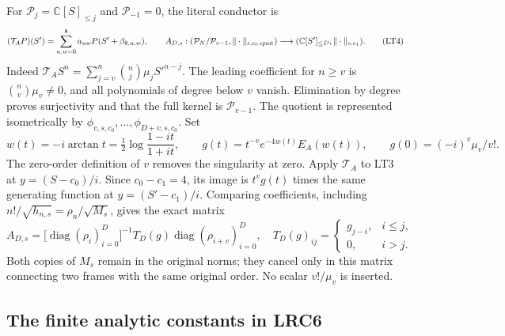 \documentclass[11pt,a4paper]{article}
\begin{document}
For $\mathcal P_j=\mathbb C[S]_{\le j}$ and
$\mathcal P_{-1}=0$, the literal conductor is
\[
 (\mathcal T_AP)(S')=\sum_{u,w=0}^{8}a_{uw}P(S'+\beta_{8,u,w}),
 \qquad
 A_{D,s}:(\mathcal P_N/\mathcal P_{v-1},\|\cdot\|_{s,c_0,\rm quot})
       \longrightarrow(\mathbb C[S']_{\le D},\|\cdot\|_{s,c_1}).
                                                               \tag{LT4}
\]
Indeed $\mathcal T_AS^n=\sum_{j=v}^n\binom nj\mu_jS'^{n-j}$.
The leading coefficient for $n\ge v$ is $\binom nv\mu_v\ne0$,
and all polynomials of degree below $v$ vanish. Elimination by degree
proves surjectivity and that the full kernel is $\mathcal P_{v-1}$.
The quotient is represented isometrically by
$\phi_{v,s,c_0},\ldots,\phi_{D+v,s,c_0}$.
Set
\[
 w(t)=-i\arctan t=\tfrac12\log\frac{1-it}{1+it},\qquad
 g(t)=t^{-v}e^{-4w(t)}E_A(w(t)),\qquad
 g(0)=(-i)^v\mu_v/v! .                                  \tag{LT5}
\]
The zero-order definition of $v$ removes the singularity at zero.
Apply $\mathcal T_A$ to LT3 at $y=(S-c_0)/i$.
Since $c_0-c_1=4$, its image is $t^vg(t)$ times the same generating
function at $y=(S'-c_1)/i$. Comparing coefficients, including
$n!/\sqrt{h_{n,s}}=\rho_n/\sqrt{M_s}$, gives the exact matrix
\[
 A_{D,s}=\bigl[\operatorname{diag}(\rho_i)_{i=0}^D\bigr]^{-1}
             T_D(g)\operatorname{diag}(\rho_{i+v})_{i=0}^D,
 \quad T_D(g)_{ij}=\begin{cases}g_{j-i},&i\le j,\\0,&i>j.\end{cases}
                                                               \tag{LT6}
\]
Both copies of $M_s$ remain in the original norms; they cancel only
in this matrix connecting two frames with the same original order.
No scalar $v!/\mu_v$ is inserted.

\subsection{The finite analytic constants in LRC6}
\end{document}
